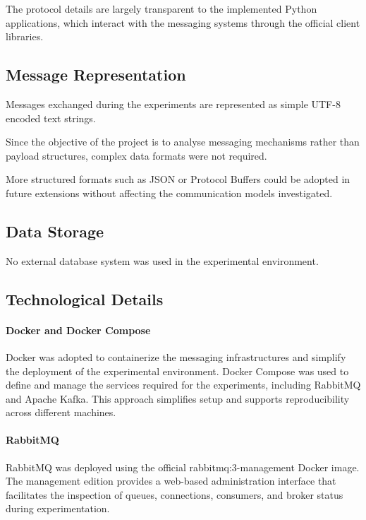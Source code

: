 \documentclass{scrartcl}
\begin{document}
The protocol details are largely transparent to the implemented Python applications, which interact with the messaging systems through the official client libraries.

\subsection{Message Representation}

Messages exchanged during the experiments are represented as simple UTF-8 encoded text strings.

Since the objective of the project is to analyse messaging mechanisms rather than payload structures, complex data formats were not required.

More structured formats such as JSON or Protocol Buffers could be adopted in future extensions without affecting the communication models investigated.


\subsection{Data Storage}

No external database system was used in the experimental environment.

\subsection{Technological Details}\label{technological-details}

\paragraph{Docker and Docker Compose}

Docker was adopted to containerize the messaging infrastructures and simplify the deployment of the experimental environment. Docker Compose was used to define and manage the services required for the experiments, including RabbitMQ and Apache Kafka. This approach simplifies setup and supports reproducibility across different machines.

\paragraph{RabbitMQ}

RabbitMQ was deployed using the official rabbitmq:3-management Docker image. The management edition provides a web-based administration interface that facilitates the inspection of queues, connections, consumers, and broker status during experimentation.
\end{document}
